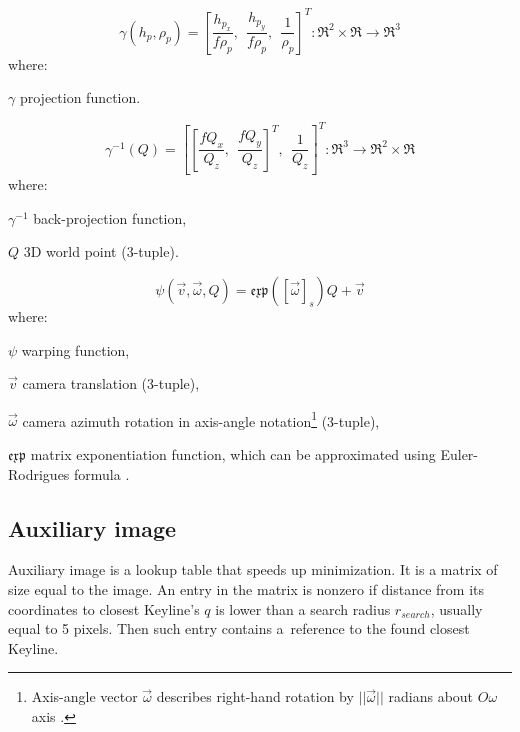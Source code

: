 \begin{equation}
\gamma(h_{p}, \rho_{p}) = \left [\frac{h_{p_x}}{f\rho_{p}},\ \ \frac{h_{p_y}}{f\rho_{p}},\ \ \frac{1}{\rho_{p}}\right ]^T: \Re^2 \times \Re \rightarrow \Re^3
\label{eq:gamma}
\end{equation}
where:
\begin{eqwhere}[2cm]
	\item[$\gamma$] projection function.
\end{eqwhere}

\begin{equation}
\gamma^{-1}(Q) = \left [ \left [ \frac{fQ_x}{Q_z},\ \ \frac{fQ_y}{Q_z} \right]^T,\ \ \frac{1}{Q_{z}}\right ]^T: \Re^3 \rightarrow  \Re^2 \times \Re
\label{eq:gammainv}
\end{equation}
where:
\begin{eqwhere}[2cm]
	\item[$\gamma^{-1}$] back-projection function,
	\item[$Q$] 3D world point (3-tuple).
\end{eqwhere}

\begin{equation}
\psi(\vec{v}, \vec{\omega}, Q) = \mathfrak{exp} \left ( \left[ \vec{\omega} \right ]_{s} \right ) Q + \vec{v}
\label{eq:rototr}
\end{equation}
where:
\begin{eqwhere}[2cm]
	\item[$\psi$] warping function,
	\item[$\vec{v}$] camera translation (3-tuple),
	\item[$\vec{\omega}$] camera azimuth rotation in axis-angle notation\footnote{Axis-angle vector $\vec{\omega}$ describes right-hand rotation by $||\vec{\omega}||$ radians about $O\omega$ axis \cite{hartley2003multiple} \cite{blanco2010tutorial}.} (3-tuple),
	\item[$ \mathfrak{exp}$] matrix exponentiation function, which can be approximated using Euler-Rodrigues formula \cite{opencv}.
\end{eqwhere}


\subsection{Auxiliary image}
\label{sec:aux}

Auxiliary image is a lookup table that speeds up minimization. It is a matrix of size equal to the image. An entry in the matrix is nonzero if distance from its coordinates to closest Keyline's $q$ is lower than a search radius $r_{search}$, usually equal to 5 pixels. Then such entry contains a~reference to the found closest Keyline.

